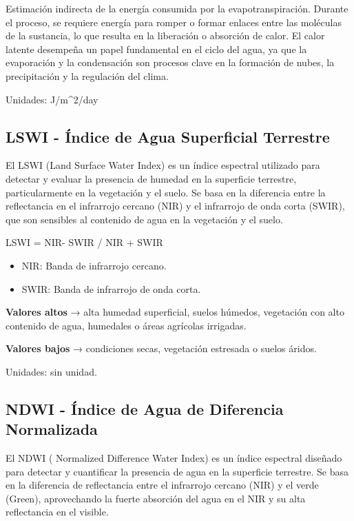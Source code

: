 \documentclass[
]{book}
\begin{document}
Estimación indirecta de la energía consumida por la evapotranspiración. Durante el proceso, se requiere energía para romper o formar enlaces entre las moléculas de la sustancia, lo que resulta en la liberación o absorción de calor. El calor latente desempeña un papel fundamental en el ciclo del agua, ya que la evaporación y la condensación son procesos clave en la formación de nubes, la precipitación y la regulación del clima.

Unidades: J/m\^{}2/day

\subsection{\texorpdfstring{\textbf{LSWI} - Índice de Agua Superficial Terrestre}{LSWI - Índice de Agua Superficial Terrestre}}\label{lswi---uxedndice-de-agua-superficial-terrestre}

El LSWI (Land Surface Water Index) es un índice espectral utilizado para detectar y evaluar la presencia de humedad en la superficie terrestre, particularmente en la vegetación y el suelo. Se basa en la diferencia entre la reflectancia en el infrarrojo cercano (NIR) y el infrarrojo de onda corta (SWIR), que son sensibles al contenido de agua en la vegetación y el suelo.

LSWI = NIR- SWIR / NIR + SWIR\hspace{0pt}

\begin{itemize}
\item
  NIR: Banda de infrarrojo cercano.
\item
  SWIR: Banda de infrarrojo de onda corta.
\end{itemize}

\textbf{Valores altos} → alta humedad superficial, suelos húmedos, vegetación con alto contenido de agua, humedales o áreas agrícolas irrigadas.

\textbf{Valores bajos} → condiciones secas, vegetación estresada o suelos áridos.

Unidades: sin unidad.

\subsection{\texorpdfstring{\textbf{NDWI} - Índice de Agua de Diferencia Normalizada}{NDWI - Índice de Agua de Diferencia Normalizada}}\label{ndwi---uxedndice-de-agua-de-diferencia-normalizada}

El NDWI ( Normalized Difference Water Index) es un índice espectral diseñado para detectar y cuantificar la presencia de agua en la superficie terrestre. Se basa en la diferencia de reflectancia entre el infrarrojo cercano (NIR) y el verde (Green), aprovechando la fuerte absorción del agua en el NIR y su alta reflectancia en el visible.
\end{document}
